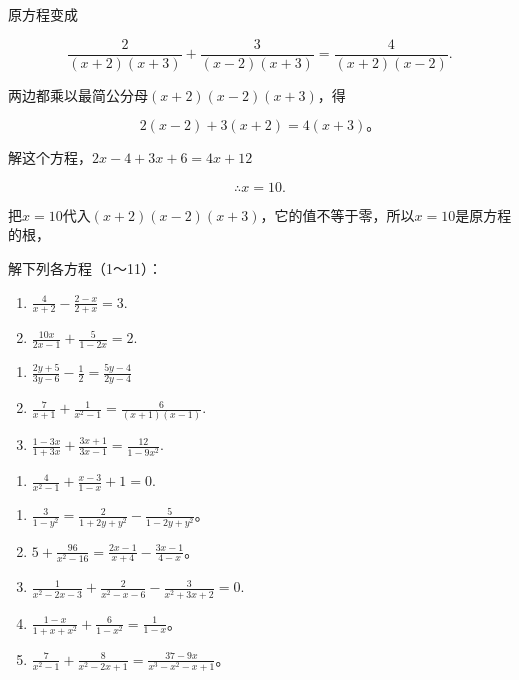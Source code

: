  原方程变成

\[
\frac{2}{(x + 2) (x + 3)} + \frac{3}{(x - 2) (x + 3)} = \frac{4}{(x + 2) (x - 2)}.
\]

两边都乘以最简公分母\((x + 2)(x - 2)(x + 3)\)，得

\[
2 (x - 2) + 3 (x + 2) = 4 (x + 3)\text{。}
\]

解这个方程，\(2x - 4 + 3x + 6 = 4x + 12\)

\[
\therefore x = 10.
\]

把\(x = 10\)代入\((x + 2)(x - 2)(x + 3)\)，它的值不等于零，所以\(x = 10\)是原方程的根，

解下列各方程（1～11）：

\begin{enumerate}[start=1]
\item
  \(\frac{4}{x + 2} -\frac{2 - x}{2 + x} = 3.\)
\item
  \(\frac{10x}{2x - 1} +\frac{5}{1 - 2x} = 2.\)
\end{enumerate}

\begin{enumerate}[start=3]
\item
  \(\frac{2y + 5}{3y - 6} -\frac{1}{2} = \frac{5y - 4}{2y - 4}\)
\item
  \(\frac{7}{x + 1} +\frac{1}{x^2 - 1} = \frac{6}{(x + 1)(x - 1)}.\)
\item
  \(\frac{1 - 3x}{1 + 3x} +\frac{3x + 1}{3x - 1} = \frac{12}{1 - 9x^2}\).
\end{enumerate}

\begin{enumerate}[start=6]
\item
  \(\frac{4}{x^2 - 1} +\frac{x - 3}{1 - x} +1 = 0.\)
\end{enumerate}

\begin{enumerate}[start=7]
\item
  \(\frac{3}{1 - y^2} = \frac{2}{1 + 2y + y^2} - \frac{5}{1 - 2y + y^2}\)。
\item
  \(5 + \frac{96}{x^2 - 16} = \frac{2x - 1}{x + 4} - \frac{3x - 1}{4 - x}\)。
\item
  \(\frac{1}{x^2 - 2x - 3} + \frac{2}{x^2 - x - 6} - \frac{3}{x^2 + 3x + 2} = 0.\)
\item
  \(\frac{1 - x}{1 + x + x^2} + \frac{6}{1 - x^2} = \frac{1}{1 - x}\)。
\item
  \(\frac{7}{x^2 - 1} + \frac{8}{x^2 - 2x + 1} = \frac{37 - 9x}{x^3 - x^2 - x + 1}\)。
\end{enumerate}

